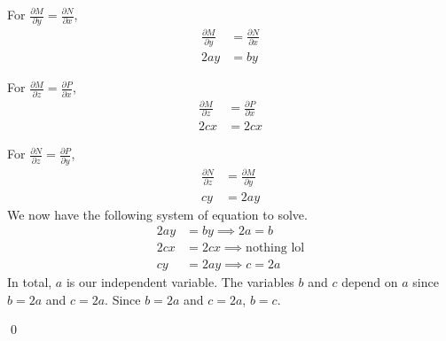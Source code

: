 \documentclass{article}
\begin{document}
{}
For $\displaystyle \frac{\partial M}{\partial y}=\frac{\partial N}{\partial x}$,
\begin{align*}
    \frac{\partial M}{\partial y}&=\frac{\partial N}{\partial x}\\
    2ay&=by
\end{align*}
{}
For $\displaystyle \frac{\partial M}{\partial z}=\frac{\partial P}{\partial x}$,
\begin{align*}
    \frac{\partial M}{\partial z}&=\frac{\partial P}{\partial x}\\
    2cx&=2cx
\end{align*}
{}
For $\displaystyle \frac{\partial N}{\partial z}=\frac{\partial P}{\partial y}$,
\begin{align*}
    \frac{\partial N}{\partial z}&=\frac{\partial M}{\partial y}\\
    cy&=2ay
\end{align*}
We now have the following system of equation to solve.
\begin{align*}
    2ay&=by\implies 2a=b\\
    2cx&=2cx\implies \text{nothing lol}\\
    cy&=2ay\implies c=2a
\end{align*}
In total, $a$ is our independent variable. The variables $b$ and $c$ depend on $a$ since $b=2a$ and $c=2a$. Since $b=2a$ and $c=2a$, $b=c$.

\qed
\end{document}
